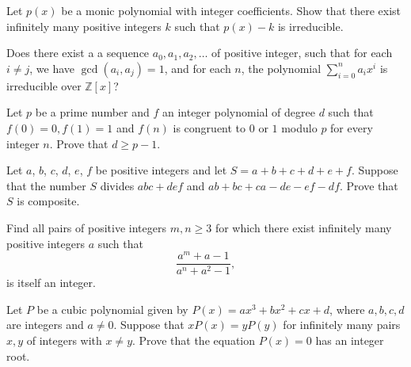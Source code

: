 \documentclass[12pt,a4paper]{memoir}
\theoremstyle{definition}
\begin{document}
\begin{question}[name={2007 MOP}]
	Let $p(x)$ be a monic polynomial with integer coefficients. Show that there exist infinitely many positive integers $k$ such that $p(x)-k$ is irreducible.
\end{question}


\begin{question}[name={2007 Iran TST}]
	Does there exist a a sequence $a_{0},a_{1},a_{2},\dots$ of positive integer, such that for each $i\neq j$, we have $\gcd(a_{i},a_{j})=1$, and for each $n$, the polynomial $\sum_{i=0}^{n}a_{i}x^{i}$ is irreducible over $\mathbb Z[x]$?
\end{question}


\begin{question}[name={1997 IMO Shortlist}]
	Let $ p$ be a prime number and $ f$ an integer polynomial of degree $ d$ such that $ f(0) = 0,f(1) = 1$ and $ f(n)$ is congruent to $ 0$ or $ 1$ modulo $ p$ for every integer $ n$. Prove that $ d\geq p - 1$.
\end{question}


\begin{question}[name={2005 IMO Shortlist}]
	Let $ a$, $ b$, $ c$, $ d$, $ e$, $ f$ be positive integers and let $ S = a+b+c+d+e+f$. Suppose that the number $ S$ divides $ abc+def$ and $ ab+bc+ca-de-ef-df$. Prove that $ S$ is composite.
\end{question}

\begin{question}[name={2002 IMO}]
	Find all pairs of positive integers $m,n\geq3$ for which there exist infinitely many positive integers $a$ such that\[ \frac{a^m+a-1}{a^n+a^2-1},  \] is itself an integer.
\end{question}

\begin{question}[name={2002 IMO Shortlist}]
	Let $P$ be a cubic polynomial given by $P(x)=ax^3+bx^2+cx+d$, where $a,b,c,d$ are integers and $a\ne0$. Suppose that $xP(x)=yP(y)$ for infinitely many pairs $x,y$ of integers with $x\ne y$. Prove that the equation $P(x)=0$ has an integer root.
\end{question}
\end{document}
